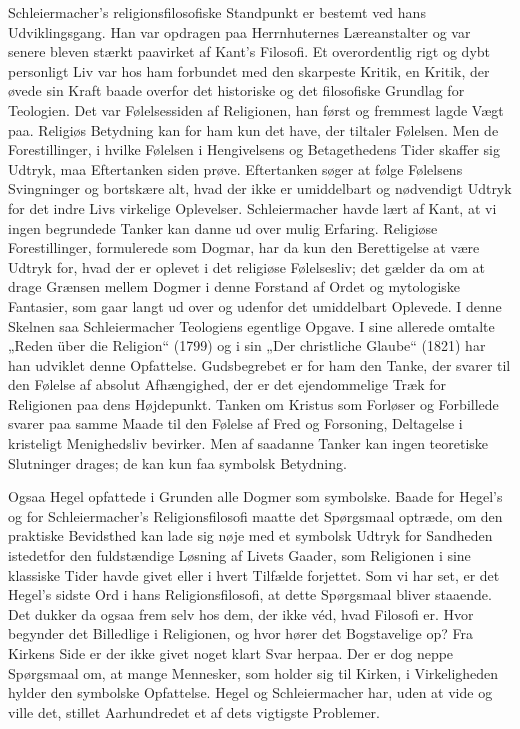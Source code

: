 \documentclass[12pt,a4paper,openany]{book}
\newcommand{\opage}[1]{\marginnote{\footnotesize\textit{[#1]}}}
\begin{document}
Schleiermacher’s religionsfilosofiske Standpunkt er bestemt ved
hans Udviklingsgang. Han var opdragen paa Herrnhuternes Læreanstalter
og var senere bleven stærkt paavirket af Kant’s Filosofi.
Et overordentlig rigt og dybt personligt Liv var hos ham forbundet
med den skarpeste Kritik, en Kritik, der øvede sin Kraft baade overfor
det historiske og det filosofiske Grundlag for Teologien. Det var
Følelsessiden af Religionen, han først og fremmest lagde Vægt paa.
Religiøs Betydning kan for ham kun det have, der tiltaler Følelsen.
Men de Forestillinger, i hvilke Følelsen i Hengivelsens og Betagethedens
Tider skaffer sig Udtryk, maa Eftertanken siden prøve. Eftertanken
søger at følge Følelsens Svingninger og bortskære alt, hvad
der ikke er umiddelbart og nødvendigt Udtryk for det indre Livs
virkelige Oplevelser. Schleiermacher havde lært af Kant, at vi ingen
begrundede Tanker kan danne ud over mulig Erfaring. Religiøse Forestillinger,
formulerede som Dogmar, har da kun den Berettigelse at
være Udtryk for, hvad der er oplevet i det religiøse Følelsesliv; det
gælder da om at drage Grænsen mellem Dogmer i denne Forstand af
Ordet og mytologiske Fantasier, som gaar langt ud over og udenfor det
umiddelbart Oplevede. I denne Skelnen saa Schleiermacher Teologiens
egentlige Opgave. I sine allerede omtalte „Reden über die Religion“
(1799) og i sin „Der christliche Glaube“ (1821) har han udviklet
denne Opfattelse. Gudsbegrebet er for ham den Tanke, der
svarer til den Følelse af absolut Afhængighed, der er det ejendommelige
Træk for Religionen paa dens Højdepunkt. Tanken om Kristus
som Forløser og Forbillede svarer paa samme Maade til den
Følelse af Fred og Forsoning, Deltagelse i kristeligt Menighedsliv
bevirker. Men af saadanne Tanker kan ingen teoretiske Slutninger
drages; de kan kun faa symbolsk Betydning.

Ogsaa Hegel opfattede i Grunden alle Dogmer som symbolske.
Baade for Hegel’s og for Schleiermacher’s Religionsfilosofi maatte
det Spørgsmaal optræde, om den praktiske Bevidsthed kan lade sig
nøje med et symbolsk Udtryk for Sandheden istedetfor den fuldstændige
Løsning af Livets Gaader, som Religionen i sine klassiske
Tider havde givet eller i hvert Tilfælde forjettet. Som vi har set, er
\opage{127}det Hegel’s sidste Ord i hans Religionsfilosofi, at dette Spørgsmaal
bliver staaende. Det dukker da ogsaa frem selv hos dem, der ikke véd,
hvad Filosofi er. Hvor begynder det Billedlige i Religionen, og hvor
hører det Bogstavelige op? Fra Kirkens Side er der ikke givet noget
klart Svar herpaa. Der er dog neppe Spørgsmaal om, at mange
Mennesker, som holder sig til Kirken, i Virkeligheden hylder den
symbolske Opfattelse. Hegel og Schleiermacher har, uden at vide og
ville det, stillet Aarhundredet et af dets vigtigste Problemer.
\end{document}
